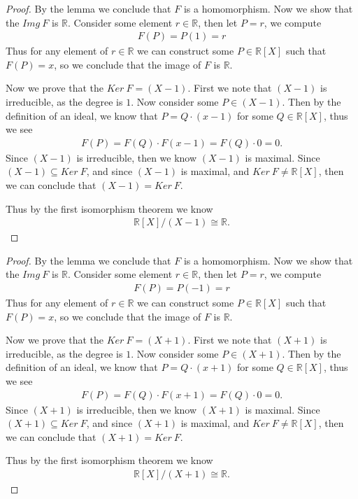 \documentclass[10pt]{armath}
\newcommand{\R}{\mathbb{R}}
\newcommand{\ra}{\rightarrow}
\newenvironment{claim}[1]{\par\noindent\textit{Claim:}\space#1}{}
\begin{document}
\begin{proof}
  By the lemma we conclude that $F$ is a homomorphism. Now we show that the
  $Img\ F$ is $\R$. Consider some element $r\in\R$, then let $P=r$, we compute
  \begin{align*}
    F(P)=P(1)=r
  \end{align*}
  Thus for any element of $r\in\R$ we can construct some $P\in\R[X]$ such that
  $F(P)=x$, so we conclude that the image of $F$ is $\R$.

  Now we prove that the $Ker\ F=(X-1)$. First we note that $(X-1)$ is
  irreducible, as the degree is $1$. Now consider some $P\in(X-1)$. Then
  by the definition of an ideal, we know that $P=Q\cdot(x-1)$ for some
  $Q\in\R[X]$, thus we see
  \begin{align*}
    F(P)=F(Q)\cdot F(x-1)=F(Q)\cdot 0=0.
  \end{align*}
  Since $(X-1)$ is irreducible, then we know $(X-1)$ is maximal. Since
  $(X-1)\subseteq Ker\ F$, and since $(X-1)$ is maximal, and $Ker\ F\neq\R[X]$,
  then we can conclude that $(X-1)=Ker\ F$.

  Thus by the first isomorphism theorem we know
  \begin{align*}
    \R[X]/(X-1)\cong\R.
  \end{align*}
\end{proof}

\begin{proof}
  By the lemma we conclude that $F$ is a homomorphism. Now we show that the
  $Img\ F$ is $\R$. Consider some element $r\in\R$, then let $P=r$, we compute
  \begin{align*}
    F(P)=P(-1)=r
  \end{align*}
  Thus for any element of $r\in\R$ we can construct some $P\in\R[X]$ such that
  $F(P)=x$, so we conclude that the image of $F$ is $\R$.

  Now we prove that the $Ker\ F=(X+1)$. First we note that $(X+1)$ is
  irreducible, as the degree is $1$. Now consider some $P\in(X+1)$. Then
  by the definition of an ideal, we know that $P=Q\cdot(x+1)$ for some
  $Q\in\R[X]$, thus we see
  \begin{align*}
    F(P)=F(Q)\cdot F(x+1)=F(Q)\cdot 0=0.
  \end{align*}
  Since $(X+1)$ is irreducible, then we know $(X+1)$ is maximal. Since
  $(X+1)\subseteq Ker\ F$, and since $(X+1)$ is maximal, and $Ker\ F\neq\R[X]$,
  then we can conclude that $(X+1)=Ker\ F$.


  Thus by the first isomorphism theorem we know
  \begin{align*}
    \R[X]/(X+1)\cong\R.
  \end{align*}
\end{proof}
\end{document}
